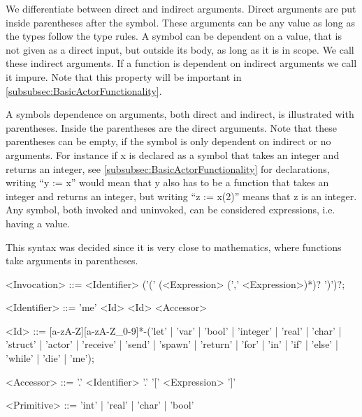 We differentiate between direct and indirect arguments. Direct arguments are put inside parentheses after the symbol. These arguments can be any value as long as the types follow the type rules. A symbol can be dependent on a value, that is not given as a direct input, but outside its body, as long as it is in scope. We call these indirect arguments. If a function is dependent on indirect arguments we call it impure. Note that this property will be important in \cref{subsubsec:BasicActorFunctionality}. 

A symbols dependence on arguments, both direct and indirect, is illustrated with parentheses. Inside the parentheses are the direct arguments. Note that these parentheses can be empty, if the symbol is only dependent on indirect or no arguments. For instance if x is declared as a symbol that takes an integer and returns an integer, see \cref{subsubsec:BasicActorFunctionality} for declarations, writing \enquote{y := x} would mean that y also has to be a function that takes an integer and returns an integer, but writing \enquote{z := x(2)} means that z is an integer. Any symbol, both invoked and uninvoked, can be considered expressions, i.e. having a value.

This syntax was decided since it is very close to mathematics, where functions take arguments in parentheses.
\begin{grammar}
<Invocation> ::= <Identifier> ('(' (<Expression> (',' <Expression>)*)? ')')?;

<Identifier> ::= 'me'
 \alt <Id>
 \alt <Id> <Accessor>

<Id> ::= [a-zA-Z][a-zA-Z\_0-9]*-('let' | 'var' | 'bool' | 'integer' | 'real' | 'char' | 'struct' | 'actor' | 'receive' | 'send' | 'spawn' | 'return' | 'for' | 'in' | 'if' | 'else' | 'while' | 'die' | 'me');

<Accessor> ::= '.' <Identifier>
 \alt '.' '[' <Expression> ']'

<Primitive> ::= 'int' | 'real' | 'char' | 'bool'
\end{grammar}

